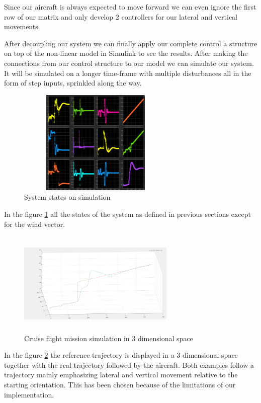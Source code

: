 \documentclass[conference]{IEEEtran}
\begin{document}
Since our aircraft is always expected to move forward we can even ignore the first row of our matrix and only develop 2 controllers for our lateral and vertical movements.
\par
After decoupling our system we can finally apply our complete control a
structure on top of the non-linear model in Simulink to see the results. After
making the connections from our control structure to our model we can simulate
our system. It will be simulated on a longer time-frame with multiple
disturbances all in the form of step inputs, sprinkled along the way.
\par
\begin{figure} [h]
    \includegraphics[width=75mm,height=50mm]{StatesSimulation.PNG}
    \caption[]{System states on simulation}\label{fig:SIMULINK6}
\end{figure}
In the figure {\ref{fig:SIMULINK6}} all the states of the system as defined in previous sections except for the wind vector.
\begin{figure} [h]
    \includegraphics[width=75mm,height=50mm]{PathFollowing.PNG}
    \caption[]{Cruise flight mission simulation in 3 dimensional space}\label{fig:SIMULINK8}
\end{figure}
In the figure {\ref{fig:SIMULINK8}} the reference trajectory is displayed in a 3 dimensional space together with the real trajectory followed by the aircraft.
Both examples follow a trajectory mainly emphasizing lateral and vertical movement relative to the starting orientation.
This has been chosen because of the limitations of our implementation.
\end{document}
